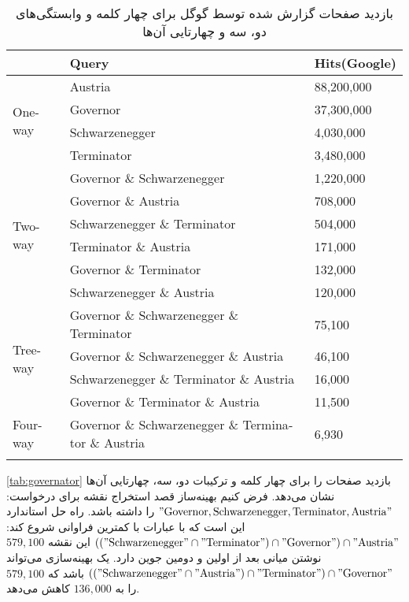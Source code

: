 \begin{table}[h]
\caption{
بازدید صفحات گزارش شده توسط گوگل
برای چهار کلمه و وابستگی‌های دو، سه و چهارتایی آن‌ها
}
\centering
\bigskip
\begin{latin}
\begin{tabular}{lll}
\hhline{===}
        		 & Query		& Hits(Google) 	\\ \hline
\multirow{4}{*}{One-way} & Austria  	& 88,200,000 	\\
			 & Governor  	& 37,300,000 	\\
			 & Schwarzenegger & 4,030,000 	\\
			 & Terminator	 & 3,480,000 	\\ \hline
\multirow{6}{*}{Two-way} & Governor \& Schwarzenegger  	& 1,220,000 	\\ 
			 & Governor \& Austria  	& 708,000 	\\
			 & Schwarzenegger \& Terminator & 504,000 	\\
			 & Terminator \& Austria  	& 171,000 	\\
			 & Governor \& Terminator  	& 132,000 	\\
			 & Schwarzenegger \& Austria  	& 120,000 	\\ \hline
\multirow{4}{*}{Tree-way} & Governor \& Schwarzenegger \& Terminator  	& 75,100 \\
			  & Governor \& Schwarzenegger \& Austria  	& 46,100 \\
			  & Schwarzenegger \& Terminator \& Austria 	& 16,000 \\
			  & Governor \& Terminator \& Austria 		& 11,500 \\ \hline
\multirow{1}{*}{Four-way} & Governor \& Schwarzenegger \& Terminator \& Austria & 6,930	\\
\hhline{===}
\end{tabular}
\end{latin}
\label{tab:governator}
\end{table}

\autoref{tab:governator}
بازدید صفحات را برای چهار کلمه و ترکیبات دو، سه، چهارتایی آن‌ها نشان می‌دهد. فرض کنیم بهینه‌ساز قصد استخراج نقشه برای درخواست:
$"\mathrm{Governor, Schwarzenegger, Terminator, Austria}"$
را داشته باشد. راه حل استاندارد این است که با عبارات با کمترین فراوانی شروع کند:
$(("\mathrm{Schwarzenegger}" \cap "\mathrm{Terminator}") \cap "\mathrm{Governor}") \cap "\mathrm{Austria}"$
این نقشه 
$579,100$
نوشتن میانی بعد از اولین و دومین جوین دارد. یک بهینه‌سازی می‌تواند 
$(("\mathrm{Schwarzenegger}" \cap "\mathrm{Austria}") \cap "\mathrm{Terminator}") \cap "\mathrm{Governor}"$
باشد که 
$579,100$
را به 
$136,000$
کاهش می‌دهد.



